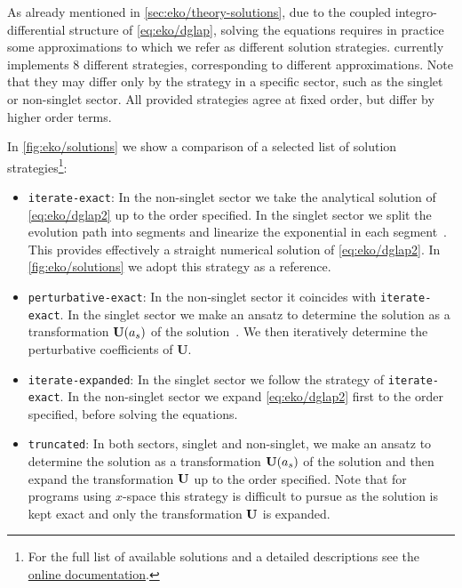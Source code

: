 As already mentioned in \cref{sec:eko/theory-solutions}, due to
the coupled integro-differential structure of \cref{eq:eko/dglap}, 
solving the equations requires in practice some approximations to which we refer as different
solution strategies. \eko{} currently implements 8 different strategies,
corresponding to different approximations.
Note that they may differ only by the strategy in a specific sector,
such as the singlet or non-singlet sector. All provided strategies
agree at fixed order, but differ by higher order terms.

In \cref{fig:eko/solutions} we show a comparison of a selected list of
solution strategies\footnote{For the full list of available solutions and a
detailed descriptions see the
\href{https://eko.readthedocs.io/en/latest}{online documentation}.}:

\begin{itemize}
    \item \texttt{iterate-exact}:
        In the non-singlet sector we take the analytical solution
        of \cref{eq:eko/dglap2} up to the order specified.
        In the singlet sector we split the evolution path into segments
        and linearize the exponential in each segment~\cite{Bonvini:2012sh}.
        This provides effectively a straight numerical solution of \cref{eq:eko/dglap2}.
        In \cref{fig:eko/solutions} we adopt this strategy as a reference.
    \item \texttt{perturbative-exact}:
        In the non-singlet sector it coincides with \texttt{iterate-exact}.
        In the singlet sector we make an ansatz to determine the solution as a
        transformation $\vb{U}(a_s)$ of the \lo{} solution~\cite{Vogt:2004ns}. We then
        iteratively determine the perturbative coefficients of $\textbf{U}$.
    \item \texttt{iterate-expanded}:
        In the singlet sector we follow the strategy of \texttt{iterate-exact}.
        In the non-singlet sector we expand \cref{eq:eko/dglap2} first to the order
        specified, before solving the equations.
    \item \texttt{truncated}: 
        In both sectors, singlet and non-singlet, we make an ansatz to determine the solution as a
        transformation $\vb{U}(a_s)$ of the \lo{} solution and
        then expand the transformation $\vb U$ up to the order specified.
        Note that for programs using $x$-space this strategy is difficult
        to pursue as the \lo{} solution is kept exact and only the transformation
        $\vb U$ is expanded.
\end{itemize}


